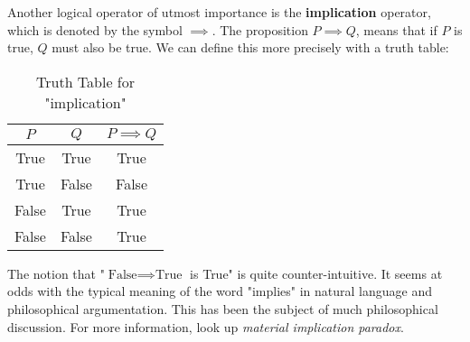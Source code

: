 Another logical operator of utmost importance is the \textbf{implication} operator,
which is denoted by the symbol \( \implies \). The proposition \( P \implies Q \),
means that if \( P \) is true, \( Q \) must also be true. We can define this more precisely
with a truth table:
\begin{table}[H]
  \centering
  \begin{tabular}{ccc}
    \toprule
    \(P\) & \(Q\) & \( P \implies Q \)  \\
    \midrule
    True & True & True \\
    True & False & False \\
    False & True & True \\
    False & False & True \\
    \bottomrule
  \end{tabular}
  \caption{Truth Table for "implication"}
\end{table}

\begin{advancedTopic}
  The notion that "\( \text{False} \implies \text{True} \) is True" is quite
  counter-intuitive. It seems at odds with the typical meaning of the word "implies" in
  natural language and philosophical argumentation. This has been the subject of
  much philosophical discussion. For more information, look up \emph{material
  implication paradox}.
\end{advancedTopic}
